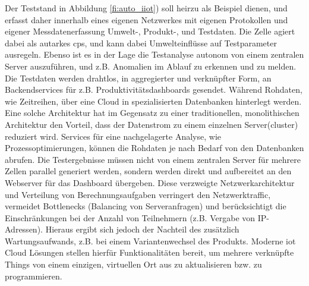 Der Teststand in Abbildung \ref{fi:auto_iiot}) soll heirzu als Beispiel dienen, und erfasst daher innerhalb eines eigenen Netzwerkes mit eigenen Protokollen und eigener Messdatenerfassung Umwelt-, Produkt-, und Testdaten. Die Zelle agiert dabei als autarkes \ac{cps}, und kann dabei Umwelteinflüsse auf Testparameter ausregeln. Ebenso ist es in der Lage die Testanalyse autonom von einem zentralen Server auszuführen, und z.B. Anomalien im Ablauf zu erkennen und zu melden. Die Testdaten werden drahtlos, in aggregierter und verknüpfter Form, an Backendservices für z.B. Produktivitätsdashboards gesendet. Während Rohdaten, wie Zeitreihen, über eine Cloud in spezialisierten Datenbanken hinterlegt werden. \newline Eine solche Architektur hat im Gegensatz zu einer traditionellen, monolithischen Architektur den Vorteil, dass der Datenstrom zu einem einzelnen Server(cluster) reduziert wird. Services für eine nachgelagerte Analyse, wie Prozessoptimierungen, können die Rohdaten je nach Bedarf von den Datenbanken abrufen. Die Testergebnisse müssen nicht von einem zentralen Server für mehrere Zellen parallel generiert werden, sondern werden direkt und aufbereitet an den Webserver für das Dashboard übergeben. Diese verzweigte Netzwerkarchitektur und Verteilung von Berechnungsaufgaben verringert den Netzwerktraffic, vermeidet Bottlenecks (Balancing von Serveranfragen) und berücksichtigt die Einschränkungen bei der Anzahl von Teilnehmern (z.B. Vergabe von IP-Adressen).
Hieraus ergibt sich jedoch der Nachteil des zusätzlich Wartungsaufwands, z.B. bei einem Variantenwechsel des Produkts. Moderne \ac{iot} Cloud Lösungen stellen hierfür Funktionalitäten bereit, um mehrere verknüpfte Things von einem einzigen, virtuellen Ort aus zu aktualisieren bzw. zu programmieren.
